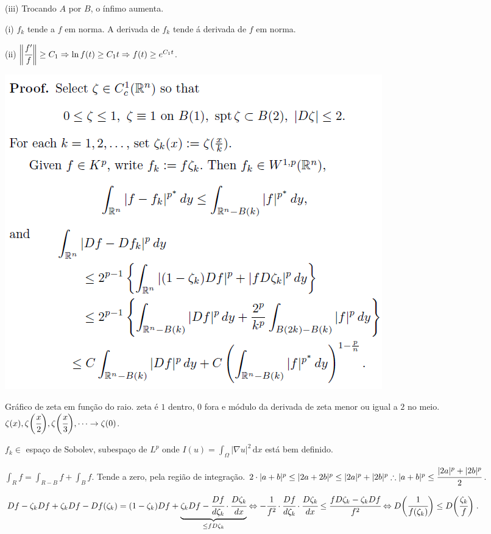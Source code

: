 \documentclass[12pt]{article}
\begin{document}
(iii) Trocando $A$ por $B$, o \'infimo aumenta.

(i) $f_k$ tende a $f$ em norma. A derivada de $f_k$ tende \'a derivada de $f$ em norma.

(ii) $\bigg\Vert \cfrac{f'}{f} \bigg\Vert \ge C_1 \Rightarrow \ln f(t) \ge C_1 t \Rightarrow f(t) \ge e^{C_1 t}$.

\vspace{300mm}

		\begin{center}
		\includegraphics[scale=.9]{3}
		\end{center}

Gr\'afico de zeta em fun\c{c}\~ao do raio. zeta \'e $1$ dentro, $0$ fora e m\'odulo da derivada de zeta menor ou igual a $2$ no meio. $\zeta(x), \zeta\bigg(\cfrac{x}{2}\bigg), \zeta\bigg(\cfrac{x}{3}\bigg), \cdots \to \zeta(0)$.

$f_k \in $ espa\c{c}o de Sobolev, subespa\c{c}o de $L^p$ onde $I(u) = \int_\Omega \vert \nabla u \vert^2\,\mathrm{d}x$ est\'a bem definido.

$\int_R f = \int_{R - B} f + \int_B f$. Tende a zero, pela regi\~ao de integra\c{c}\~ao.  $2\cdot |a + b|^p \le |2a + 2b|^p \le |2a|^p + |2b|^p \therefore |a + b|^p \le \cfrac{|2a|^p + |2b|^p}{2}$.

$Df - \zeta_k Df + \zeta_k Df - Df(\zeta_k) = (1 - \zeta_k) Df + \underbrace{\zeta_k Df - \cfrac{Df}{d\zeta_k} \cdot \cfrac{D\zeta_k}{dx}}_{\le fD\zeta_k} \Leftrightarrow  - \cfrac{1}{f^2} \cdot \cfrac{Df}{d\zeta_k} \cdot \cfrac{D\zeta_k}{dx} \le \cfrac{f D\zeta_k - \zeta_k Df}{f^2} \Leftrightarrow D\bigg( \cfrac{1}{f(\zeta_k)} \bigg) \le D\bigg( \cfrac{\zeta_k}{f} \bigg)$.
\end{document}
